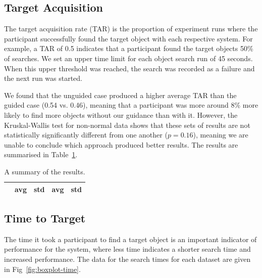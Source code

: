 \documentclass[runningheads]{llncs}
\newcommand\todo[1]{\textcolor{red}{#1}}
\begin{document}
\subsection{Target Acquisition}

The target acquisition rate (TAR) is the proportion of experiment runs where the participant successfully found the target object with each respective system. 
For example, a TAR of 0.5 indicates that a participant found the target objects 50\% of searches. 
We set an upper time limit for each object search run of 45 seconds.
When this upper threshold was reached, the search was recorded as a failure and the next run was started. 

We found that the unguided case produced a higher average TAR than the guided case (0.54 vs. 0.46), meaning that a participant was more around 8\% more likely to find more objects without our guidance than with it.
However, the Kruskal-Wallis test for non-normal data shows that these sets of results are not statistically significantly different from one another ($p = 0.16$), meaning we are unable to conclude which approach produced better results. 
The results are summarised in Table~\ref{tab:results}. 

\begin{table}
  \centering
  \caption{A summary of the results. }\label{tab:results}
  \begin{tabular}{ccccc}
    \toprule
     & avg & std & avg &std \\ \midrule
    \bottomrule
  \end{tabular}
\end{table}

\subsection{Time to Target}

The time it took a participant to find a target object is an important indicator of performance for the system, where less time indicates a shorter search time and increased performance.
The data for the search times for each dataset are given in Fig~\ref{fig:boxplot-time}.%
\end{document}
